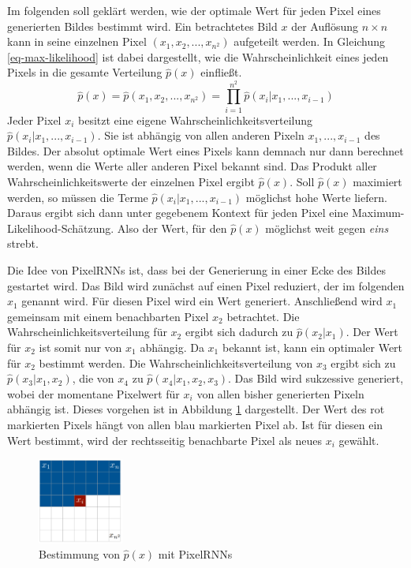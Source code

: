 Im folgenden soll geklärt werden, wie der optimale Wert für jeden Pixel eines generierten Bildes bestimmt wird. Ein betrachtetes Bild $x$ der Auflösung $n \times n$ kann in seine einzelnen Pixel $(x_{1}, x_{2}, ..., x_{n^2})$ aufgeteilt werden. In Gleichung \ref{eq-max-likelihood} ist dabei dargestellt, wie die Wahrscheinlichkeit eines jeden Pixels in die gesamte Verteilung $\hat{p}(x)$ einfließt. \cite{pixelRNN}
\begin{equation}
   \label{eq-max-likelihood}
   \hat{p}(x) = \hat{p}(x_{1}, x_{2}, ..., x_{n^2}) = \prod_{i=1}^{n^2}\hat{p}(x_{i}|x_{1},...,x_{i-1})
\end{equation}
Jeder Pixel $x_{i}$ besitzt eine eigene Wahrscheinlichkeitsverteilung $\hat{p}(x_{i}|x_{1},...,x_{i-1})$. Sie ist abhängig von allen anderen Pixeln $x_{1},...,x_{i-1}$ des Bildes. Der absolut optimale Wert eines Pixels kann demnach nur dann berechnet werden, wenn die Werte aller anderen Pixel bekannt sind. Das Produkt aller Wahrscheinlichkeitswerte der einzelnen Pixel ergibt $\hat{p}(x)$. Soll $\hat{p}(x)$ maximiert werden, so müssen die Terme $\hat{p}(x_{i}|x_{1},...,x_{i-1})$ möglichst hohe Werte liefern. Daraus ergibt sich dann unter gegebenem Kontext für jeden Pixel eine Maximum-Likelihood-Schätzung. Also der Wert, für den $\hat{p}(x)$ möglichst weit gegen \emph{eins} strebt. \cite{pixelRNN}

Die Idee von PixelRNNs ist, dass bei der Generierung in einer Ecke des Bildes gestartet wird. Das Bild wird zunächst auf einen Pixel reduziert, der im folgenden $x_{1}$ genannt wird. Für diesen Pixel wird ein Wert generiert. Anschließend wird $x_{1}$ gemeinsam mit einem benachbarten Pixel $x_{2}$ betrachtet. Die Wahrscheinlichkeitsverteilung für $x_{2}$ ergibt sich dadurch zu $\hat{p}(x_{2}|x_{1})$. Der Wert für $x_2$ ist somit nur von $x_1$ abhängig. Da $x_{1}$ bekannt ist, kann ein optimaler Wert für $x_{2}$ bestimmt werden. Die Wahrscheinlichkeitsverteilung von $x_{3}$ ergibt sich zu $\hat{p}(x_{3}|x_{1}, x_{2})$, die von $x_{4}$ zu $\hat{p}(x_{4}|x_{1}, x_{2}, x_{3})$. Das Bild wird sukzessive generiert, wobei der momentane Pixelwert für $x_{i}$ von allen bisher generierten Pixeln abhängig ist. Dieses vorgehen ist in Abbildung \ref{fig:pixelRNN} dargestellt. Der Wert des rot markierten Pixels hängt von allen blau markierten Pixel ab. Ist für diesen ein Wert bestimmt, wird der rechtsseitig benachbarte Pixel als neues $x_{i}$ gewählt.

\begin{figure}[H]
   \centering
   \includegraphics[width=0.25\textwidth]{images/Generative Networks/PixelRNN.png}
   \caption{Bestimmung von $\hat{p}(x)$ mit PixelRNNs \cite{pixelRNN}}
   \label{fig:pixelRNN}
\end{figure}

